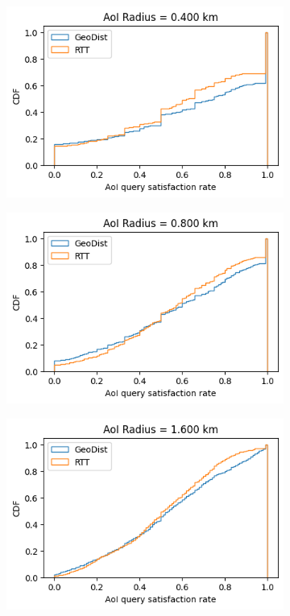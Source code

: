 \begin{figure}
\begin{subfigure}{0.333\textwidth}
  \includegraphics[width=\linewidth]{figures/mechanisms/spatial_ctx_mgmt/aoi_satisfaction_rate_cdf_AOI_0.400_km.png}
  \caption{}
\end{subfigure}
\par\medskip
\begin{subfigure}{0.333\textwidth}
  \centering
  \includegraphics[width=\linewidth]{figures/mechanisms/spatial_ctx_mgmt/aoi_satisfaction_rate_cdf_AOI_0.800_km.png}
  \caption{}
\end{subfigure}%
\begin{subfigure}{0.333\textwidth}
  \centering
  \includegraphics[width=\linewidth]{figures/mechanisms/spatial_ctx_mgmt/aoi_satisfaction_rate_cdf_AOI_1.600_km.png}

\end{subfigure}
\end{figure}
